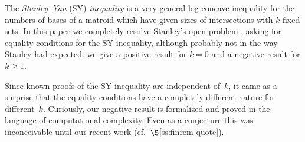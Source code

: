 \documentclass[11pt]{amsart}
\theoremstyle{definition}
\numberwithin{figure}{section}
\numberwithin{equation}{section}
\def\ts{\hskip.03cm}
\def\ts{\hskip.03cm}
\begin{document}
The \emph{Stanley--Yan} (SY) \emph{inequality} is a very general log-concave
inequality for the numbers of bases of a matroid which have given sizes of
intersections with $k$ fixed sets.  In this paper we completely resolve
Stanley's open problem \cite[p.~60]{Sta-AF}, asking for equality conditions
for the SY inequality, although probably not in the
way Stanley had expected: we give a positive result for $k=0$
and a negative result for $k\ge 1$.

Since known proofs of the SY inequality are independent of~$k$,
it came as a surprise that the equality conditions have a completely
different nature for different~$k$.  Curiously, our negative result
is formalized and proved in the language of computational complexity.
Even as a conjecture this was inconceivable until our recent work
(cf.~$\S$\ref{ss:finrem-quote}).

%

\smallskip
\end{document}
